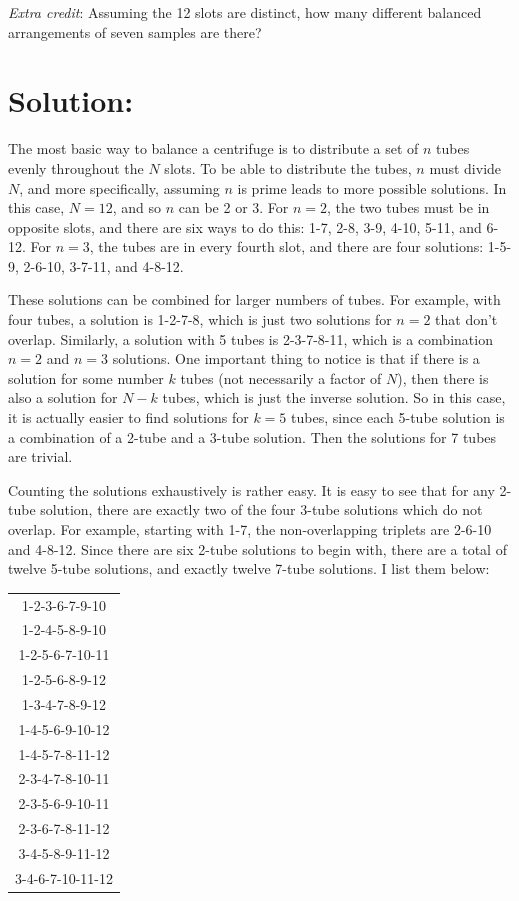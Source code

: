 \documentclass{article}
\begin{document}
\textit{Extra credit}: Assuming the 12 slots are distinct, how many different balanced arrangements of seven samples are there?

\section*{Solution:}

The most basic way to balance a centrifuge is to distribute a set of $n$ tubes evenly throughout the $N$ slots.
To be able to distribute the tubes, $n$ must divide $N$, and more specifically, assuming $n$ is prime leads to more possible solutions.
In this case, $N=12$, and so $n$ can be 2 or 3.
For $n=2$, the two tubes must be in opposite slots, and there are six ways to do this: 1-7, 2-8, 3-9, 4-10, 5-11, and 6-12.
For $n=3$, the tubes are in every fourth slot, and there are four solutions: 1-5-9, 2-6-10, 3-7-11, and 4-8-12.

These solutions can be combined for larger numbers of tubes.
For example, with four tubes, a solution is 1-2-7-8, which is just two solutions for $n=2$ that don't overlap.
Similarly, a solution with 5 tubes is 2-3-7-8-11, which is a combination $n=2$ and $n=3$ solutions.
One important thing to notice is that if there is a solution for some number $k$ tubes (not necessarily a factor of $N$), then there is also a solution for $N-k$ tubes, which is just the inverse solution.
So in this case, it is actually easier to find solutions for $k=5$ tubes, since each 5-tube solution is a combination of a 2-tube and a 3-tube solution.
Then the solutions for 7 tubes are trivial.

Counting the solutions exhaustively is rather easy.
It is easy to see that for any 2-tube solution, there are exactly two of the four 3-tube solutions which do not overlap.
For example, starting with 1-7, the non-overlapping triplets are 2-6-10 and 4-8-12.
Since there are six 2-tube solutions to begin with, there are a total of twelve 5-tube solutions, and exactly twelve 7-tube solutions. I list them below:

\vspace{0.1in}
\begin{center}
\begin{tabular}{c}
1-2-3-6-7-9-10\\
1-2-4-5-8-9-10\\
1-2-5-6-7-10-11\\
1-2-5-6-8-9-12\\
1-3-4-7-8-9-12\\
1-4-5-6-9-10-12\\
1-4-5-7-8-11-12\\
2-3-4-7-8-10-11\\
2-3-5-6-9-10-11\\
2-3-6-7-8-11-12\\
3-4-5-8-9-11-12\\
3-4-6-7-10-11-12
\end{tabular}
\end{center}
\end{document}
